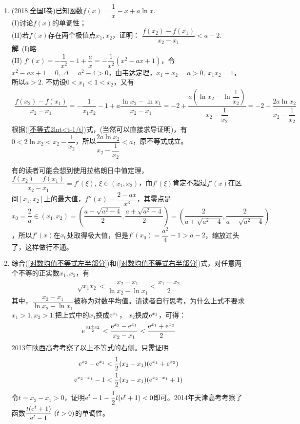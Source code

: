 \begin{enumerate}[label={【\textbf{例\thechapter.\arabic*}】},
 leftmargin=\inteval{\myenumleftmargin}pt,
 itemsep=\inteval{\myenumitempsep}pt,
 itemindent=\inteval{\myenumitemindent}pt]
\item (2018,全国I卷)已知函数$ f(x)=\dfrac{1}{x}-x+a\ln x $.\\
(I)讨论$ f(x) $的单调性；\\
(II)若$ f(x) $存在两个极值点$ x_1,x_2 $，证明：
$ \dfrac{f(x_2)-f(x_1)}{x_2-x_1}<a-2 $. \\
\textbf{解}\ (I)略 \\
(II) $ f'(x)=-\dfrac{1}{x^2}-1+\dfrac{a}{x}=-\dfrac{1}{x^2}(x^2-ax+1) $，令$ x^2-ax+1=0,\ \Delta=a^2-4>0 $，由韦达定理，$ x_1+x_2=a>0,\ x_1x_2=1 $，所以$ a>2 $. 不妨设$ 0<x_1<1<x_2 $，又有
\begin{align*}
	\dfrac{f(x_2)-f(x_1)}{x_2-x_1}=-\dfrac{1}{x_1x_2}-1+
	a\dfrac{\ln x_2-\ln x_1}{x_2-x_1} 
	=-2+\dfrac{a(\ln x_2-\ln \dfrac{1}{x_2})}
	{x_2-\dfrac{1}{x_2}} 	
	=-2+\dfrac{2a\ln x_2}{x_2-\dfrac{1}{x_2}}
\end{align*}
根据(\ref{不等式2lnt<t-1/t})式，(当然可以直接求导证明)，有$ 0<2\ln x_2<x_2-\dfrac{1}{x_2} $，所以$ \dfrac{2a\ln x_2}{x_2-\dfrac{1}{x_2}}<a $，原不等式成立。

有的读者可能会想到使用拉格朗日中值定理，$ \dfrac{f(x_2)-f(x_1)}{x_2-x_1}=f'(\xi),\  \xi\in(x_1,x_2) $，而$f'(\xi) $肯定不超过$ f'(x) $在区间$ [x_1,x_2] $上的最大值，$ f''(x)=\dfrac{2-ax}{x^3} $，其零点是$ x_0=\dfrac{2}{a}\in (x_1,x_2)=\left(\dfrac{a-\sqrt{a^2-4}}{2},\dfrac{a+\sqrt{a^2-4}}{2}\right)=\left(\dfrac{2}{a+\sqrt{a^2-4}},\dfrac{2}{a-\sqrt{a^2-4}}\right) $，所以$ f'(x) $在$ x_0 $处取得极大值，但是$ f'(x_0)=\dfrac{a^2}{4}-1>a-2 $，缩放过头了，这样做行不通。

\item 综合(\ref{对数均值不等式左半部分})和(\ref{对数均值不等式右半部分})式，对任意两个不等的正实数$ x_1,x_2 $，有
\begin{align} \label{对数割线斜率不等式}
	\sqrt{x_1x_2}<\dfrac{x_2-x_1}{\ln x_2-\ln x_1}<\dfrac{x_1+x_2}{2}
\end{align}
其中，$ \dfrac{x_2-x_1}{\ln x_2-\ln x_1} $被称为对数平均值。请读者自行思考，为什么上式不要求$ x_1>1,x_2>1 $.把上式中的$ x_1 $换成$ \mathrm{e}^{x_1} $，
$ x_2 $换成$ \mathrm{e}^{x_2} $，可得：
\begin{align*}
	\mathrm{e}^{\frac{x_1+x_2}{2}}<\dfrac{\mathrm{e}^{x_2}-\mathrm{e}^{x_1}}{x_2-x_1}<
	\dfrac{\mathrm{e}^{x_1}+\mathrm{e}^{x_2}}{2}
\end{align*}
2013年陕西高考考察了以上不等式的右侧。只需证明
\begin{gather*}
	\mathrm{e}^{x_2}-\mathrm{e}^{x_1}<\dfrac{1}{2}(x_2-x_1)(\mathrm{e}^{x_1}+\mathrm{e}^{x_2}) \\
	\mathrm{e}^{x_2-x_1}-1<\dfrac{1}{2}(x_2-x_1)(\mathrm{e}^{x_2-x_1}+1) 
\end{gather*}
令$ t=x_2-x_1>0 $，证明$ \mathrm{e}^t-1-\dfrac{1}{2}t(\mathrm{e}^t+1)<0 $即可。2014年天津高考考察了函数$ \dfrac{t(\e^t+1)}{\e^t-1}\ (t>0) $的单调性。


\end{enumerate}
